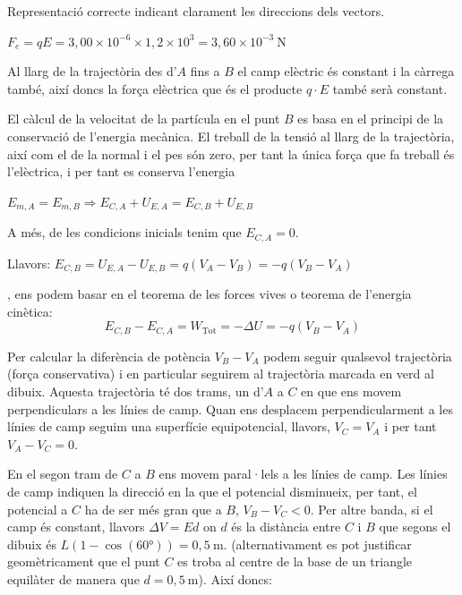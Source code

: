 \begin{solapartat}
 Representació correcte indicant clarament les direccions dels vectors.


 $F_e = qE = 3,00\times 10^{-6}\times 1,2\times 10^3 = 3,60\times 10^{-3}\ \mathrm{N}$

 Al llarg de la trajectòria des d'$A$ fins a $B$ el camp elèctric és constant i la càrrega també, així doncs la força elèctrica que és el producte $q\cdot E$ també serà constant.
\end{solapartat}

\begin{solapartat}
 El càlcul de la velocitat de la partícula en el punt $B$ es basa en el principi de la conservació de l'energia mecànica. El treball de la tensió al llarg de la trajectòria, així com el de la normal i el pes són zero, per tant la única força que fa treball és l'elèctrica, i per tant es conserva l'energia

 $E_{m,A} = E_{m,B} \Rightarrow E_{C,A}+U_{E,A} = E_{C,B}+U_{E,B}$

A més, de les condicions inicials tenim que $E_{C,A} = 0$.

Llavors: $E_{C,B} = U_{E,A}-U_{E,B} = q(V_A-V_B) = -q(V_B-V_A)$

, ens podem basar en el teorema de les forces vives o teorema de l'energia cinètica:
\[ E_{C,B}-E_{C,A} = W_\mathrm{Tot} = -\Delta U = -q(V_B-V_A) \]


 Per calcular la diferència de potència $V_B-V_A$ podem seguir qualsevol trajectòria (força conservativa) i en particular seguirem al trajectòria marcada en verd al dibuix. Aquesta trajectòria té dos trams, un d'$A$ a $C$ en que ens movem perpendiculars a les línies de camp. Quan ens desplacem perpendicularment a les línies de camp seguim una superfície equipotencial, llavors, $V_C = V_A$ i per tant $V_A-V_C = 0$.

En el segon tram de $C$ a $B$ ens movem paral·lels a les línies de camp. Les línies de camp indiquen la direcció en la que el potencial disminueix, per tant, el potencial a $C$ ha de ser més gran que a $B$, $V_B-V_C<0$. Per altre banda, si el camp és constant, llavors $\Delta V = Ed$ on $d$ és la distància entre $C$ i $B$ que segons el dibuix és $L(1-\cos(60°)) = 0,5\ \mathrm{m}$. (alternativament es pot justificar geomètricament que el punt $C$ es troba al centre de la base de un triangle equilàter de manera que $d = 0,5\ \mathrm{m}$). Així doncs:


\end{solapartat}

